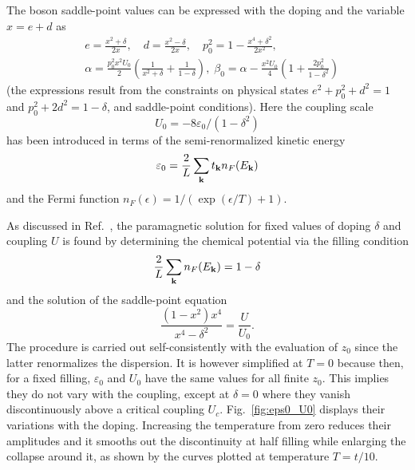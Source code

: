 \documentclass[showpacs,amsmath,twocolumn,floatfix]{revtex4-1}
\begin{document}
The boson saddle-point values can be expressed with the 
doping and the variable $x =e +d$ as  
\begin{eqnarray}
& e = \frac{x^2 + \delta}{2x}, \quad d = \frac{x^ 2 - \delta}{2 x} ,
\quad p_0^2 = 1 - \frac{x^4 + \delta^ 2}{2 x^2} , \\
& \alpha  =  \frac{p_0^2 x^2 U_0}{2} \left(\frac{1}{x^2 + \delta} + \frac{1}{1-\delta} 
\right), \; \beta_0  =  \alpha - \frac{x^2 U_0}{4} \left( 1 + \frac{2 p_0^2}{1-\delta^2} 
\right) \nonumber
\end{eqnarray}
(the expressions result from the constraints on physical states 
$e^2 + p_0^2 + d^2 = 1$ and $p_0^2 + 2 d^2 = 1- \delta$, and saddle-point 
conditions). Here the coupling scale
\begin{equation}
 U_0 = - 8 \varepsilon_0/(1-\delta^2)
\end{equation}
has been introduced in terms of the semi-renormalized kinetic energy 
 \begin{equation}
 \varepsilon_0 =  \frac{2}{L} \sum_{{\bf k}}  t_{{\bf k}} n_F(E_{{\bf k}})
 \end{equation}
 and the Fermi function $n_F(\epsilon) = 1/(\exp(\epsilon/T) + 1)$. 



 
As discussed in Ref.~\cite{Vol87,FW}, the paramagnetic solution for fixed 
values of doping $\delta$ and coupling $U$ is found by determining 
the chemical potential via the filling condition
\begin{equation}
  \frac{2}{L} \sum_{{\bf k}} n_F(E_{{\bf k}}) = 1 - \delta
\end{equation}
 and the solution of the saddle-point equation
\begin{equation}
\frac{(1-x^2) x^4}{x^4 - \delta^2}  =  \frac{U}{U_0}.
\end{equation}
The procedure is carried out self-consistently with the evaluation of 
$z_0$ since the latter renormalizes the dispersion. It is however 
simplified at $T=0$ because then, for a fixed filling, $\varepsilon_0$ 
and $U_0$ have the same values for all finite $z_0$. This implies they 
do not vary with the coupling, except at $\delta=0$ where they vanish 
discontinuously above a critical coupling $U_c$. Fig.~\ref{fig:eps0_U0} 
displays their variations with the doping. Increasing the temperature
from zero reduces their amplitudes and it smooths out the discontinuity 
at half filling while enlarging the collapse around it, as shown by the 
curves plotted at temperature $T=t/10$.
\end{document}
